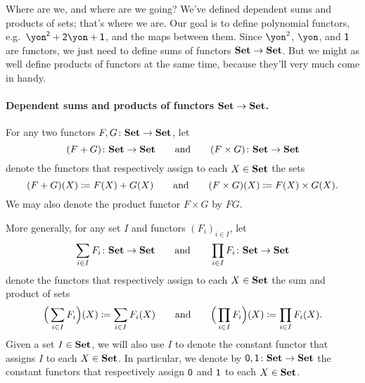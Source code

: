 \documentclass[Book-Poly]{subfiles}
\begin{document}
Where are we, and where are we going? We've defined dependent sums and products of sets; that's where we are. Our goal is to define polynomial functors, e.g.\ $\yon^\2+\2\yon+\1$, and the maps between them. Since $\yon^2$, $\yon$, and $\textsf{1}$ are functors, we just need to define sums of functors $\textbf{Set}\to\textbf{Set}$. But we might as well define products of functors at the same time, because they'll very much come in handy.

\paragraph{Dependent sums and products of functors $\textbf{Set}\to\textbf{Set}$.}

\begin{definition}\label{def.sum_prod}
For any two functors $F,G\colon\textbf{Set}\to\textbf{Set}$, let
\[
  (F+G)\colon\textbf{Set}\to\textbf{Set}
  \qquad\text{and}\qquad
  (F\times G)\colon\textbf{Set}\to\textbf{Set}
\]
denote the functors that respectively assign to each $X\in\textbf{Set}$ the sets
\[
  (F+G)(X)\coloneqq F(X)+G(X)
  \qquad\text{and}\qquad
	(F\times G)(X)\coloneqq F(X)\times G(X).
\]
We may also denote the product functor $F \times G$ by $FG$.

More generally, for any set $I$ and functors $(F_i)_{i\in I}$, let
\[
\sum_{i\in I}F_i\colon\textbf{Set}\to\textbf{Set}
\qquad\text{and}\qquad
\prod_{i\in I}F_i\colon\textbf{Set}\to\textbf{Set}
\]
denote the functors that respectively assign to each $X\in\textbf{Set}$ the sum and product of sets
\[
	\Big(\sum_{i\in I}F_i\Big)(X)\coloneqq\sum_{i\in I} F_i(X)
	\qquad\text{and}\qquad
	\Big(\prod_{i\in I}F_i\Big)(X)\coloneqq\prod_{i\in I} F_i(X).
\]
Given a set $I\in\textbf{Set}$, we will also use $I$ to denote the constant functor that assigns $I$ to each $X\in\textbf{Set}$.
In particular, we denote by $\textsf{0},\textsf{1}\colon\textbf{Set}\to\textbf{Set}$ the constant functors that respectively assign $\textsf{0}$ and $\textsf{1}$ to each $X\in\textbf{Set}$.
\end{definition}
\end{document}
